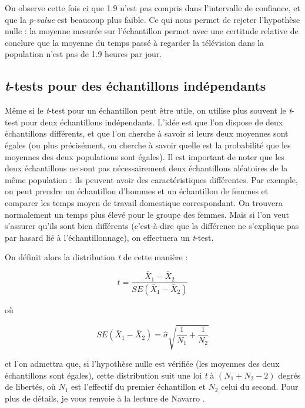 \documentclass[
  french,
]{book}
\begin{document}
On observe cette fois ci que 1.9 n'est pas compris dans l'intervalle de confiance, et que la \emph{p-value} est beaucoup plus faible. Ce qui nous permet de rejeter l'hypothèse nulle : la moyenne mesurée sur l'échantillon permet avec une certitude relative de conclure que la moyenne du temps passé à regarder la télévision dans la population n'est pas de 1.9 heures par jour.

\hypertarget{t-tests-pour-des-uxe9chantillons-induxe9pendants}{%
\subsection{\texorpdfstring{\emph{t}-tests pour des échantillons indépendants}{t-tests pour des échantillons indépendants}}\label{t-tests-pour-des-uxe9chantillons-induxe9pendants}}

Même si le \emph{t}-test pour un échantillon peut être utile, on utilise plus souvent le \emph{t}-test pour deux échantillons indépendants. L'idée est que l'on dispose de deux échantillons différents, et que l'on cherche à savoir si leurs deux moyennes sont égales (ou plus précisément, on cherche à savoir quelle est la probabilité que les moyennes des deux populations sont égales). Il est important de noter que les deux échantillons ne sont pas nécessairement deux échantillons aléatoires de la même population : ils peuvent avoir des caractéristiques différentes. Par exemple, on peut prendre un échantillon d'hommes et un échantillon de femmes et comparer les temps moyen de travail domestique correspondant. On trouvera normalement un temps plus élevé pour le groupe des femmes. Mais si l'on veut s'assurer qu'ils sont bien différents (c'est-à-dire que la différence ne s'explique pas par hasard lié à l'échantillonnage), on effectuera un \emph{t}-test.

On définit alors la distribution \emph{t} de cette manière :

\[ t = \frac{\bar{X}_1 - \bar{X}_2}{SE(\bar{X}_1 - \bar{X}_2)}\]

où

\[ SE(\bar{X}_1 - \bar{X}_2) = \hat{\sigma} \sqrt{\frac{1}{N_1} + \frac{1}{N_2}}\]

et l'on admettra que, si l'hypothèse nulle est vérifiée (les moyennes des deux échantillons sont égales), cette distribution suit une loi \emph{t} à \((N_1+N_2-2)\) degrés de libertés, où \(N_1\) est l'effectif du premier échantillon et \(N_2\) celui du second. Pour plus de détails, je vous renvoie à la lecture de Navarro \citep[chapitre 13]{navarro2015}.
\end{document}
